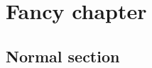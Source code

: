 \documentclass{report}
\begin{document}
\tableofcontents

\chapter{Fancy chapter}

\section{Normal section}
\end{document}
